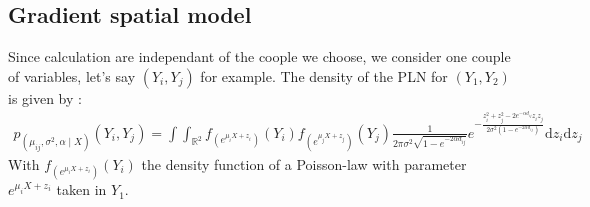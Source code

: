 \documentclass[11pt, a4paper]{article}
\begin{document}
\subsection{Gradient spatial model}
Since calculation are independant of the coople we choose, we consider one couple of variables, let's say $(Y_i,Y_j)$ for example. The density of the PLN for $(Y_1,Y_2)$ is given by :
\begin{align*}
p_{(\mu_{ij},\sigma^2,\alpha \mid X)}(Y_i,Y_j) = \int \int _{\mathbb{R}^2} f_{(e^{\mu_i X + z_i})}(Y_i) f_{(e^{\mu_j X + z_j})}(Y_j) \frac{1}{2 \pi \sigma^2 \sqrt{1-e^{-2 \alpha d_{ij}}}} e^{- \frac{z_i^2+z_j^2-2 e^{- \alpha d_{ij}} z_i z_j}{2 \sigma^2 (1- e^{-2 \alpha d_{ij}})}} \mathrm{d}z_i \mathrm{d} z_j
\end{align*}
With $f_{(e^{\mu_i X + z_i})}(Y_i)$ the density function of a Poisson-law with parameter $e^{\mu_i X + z_i}$ taken in $Y_1$.\\
\\
\end{document}
